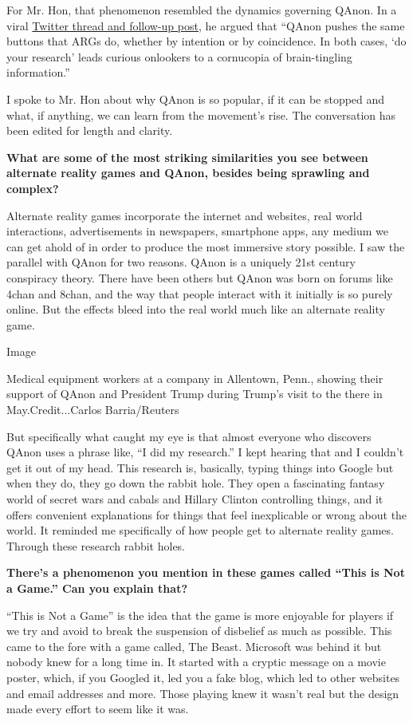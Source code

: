 For Mr. Hon, that phenomenon resembled the dynamics governing QAnon. In
a viral
\href{https://mssv.net/2020/08/02/what-args-can-teach-us-about-qanon/}{Twitter
thread and follow-up post}, he argued that ``QAnon pushes the same
buttons that ARGs do, whether by intention or by coincidence. In both
cases, `do your research' leads curious onlookers to a cornucopia of
brain-tingling information.''

I spoke to Mr. Hon about why QAnon is so popular, if it can be stopped
and what, if anything, we can learn from the movement's rise. The
conversation has been edited for length and clarity.

\textbf{What are some of the most striking similarities you see between
alternate reality games and QAnon, besides being sprawling and complex?}

Alternate reality games incorporate the internet and websites, real
world interactions, advertisements in newspapers, smartphone apps, any
medium we can get ahold of in order to produce the most immersive story
possible. I saw the parallel with QAnon for two reasons. QAnon is a
uniquely 21st century conspiracy theory. There have been others but
QAnon was born on forums like 4chan and 8chan, and the way that people
interact with it initially is so purely online. But the effects bleed
into the real world much like an alternate reality game.

Image

Medical equipment workers at a company in Allentown, Penn., showing
their support of QAnon and President Trump during Trump's visit to the
there in May.Credit...Carlos Barria/Reuters

But specifically what caught my eye is that almost everyone who
discovers QAnon uses a phrase like, ``I did my research.'' I kept
hearing that and I couldn't get it out of my head. This research is,
basically, typing things into Google but when they do, they go down the
rabbit hole. They open a fascinating fantasy world of secret wars and
cabals and Hillary Clinton controlling things, and it offers convenient
explanations for things that feel inexplicable or wrong about the world.
It reminded me specifically of how people get to alternate reality
games. Through these research rabbit holes.

\textbf{There's a phenomenon you mention in these games called ``This is
Not a Game.'' Can you explain that?}

``This is Not a Game'' is the idea that the game is more enjoyable for
players if we try and avoid to break the suspension of disbelief as much
as possible. This came to the fore with a game called, The Beast.
Microsoft was behind it but nobody knew for a long time in. It started
with a cryptic message on a movie poster, which, if you Googled it, led
you a fake blog, which led to other websites and email addresses and
more. Those playing knew it wasn't real but the design made every effort
to seem like it was.

